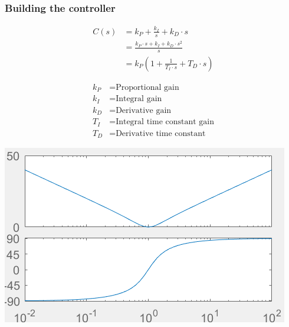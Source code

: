     \subsubsection{Building the controller}
        \begin{minipage}{0.49\linewidth}
            \begin{align*}
                C(s) &= k_P + \frac{k_I}{s} + k_D \cdot s\\
                &= \frac{k_P \cdot s + k_I + k_D \cdot s^2}{s}\\
                &= k_P(1 + \frac{1}{T_I \cdot s} + T_D \cdot s)
            \end{align*}
        \end{minipage}
        \begin{minipage}{0.49\linewidth}
            \begin{scriptsize}
                \begin{align*}
                    k_P &= \text{Proportional gain}\\
                    k_I &= \text{Integral gain}\\
                    k_D &= \text{Derivative gain}\\
                    T_I &= \text{Integral time constant gain}\\
                    T_D &= \text{Derivative time constant}
                \end{align*}
            \end{scriptsize}
        \end{minipage}
        \includegraphics[width = \linewidth]{src/images/PID-controller.png}
